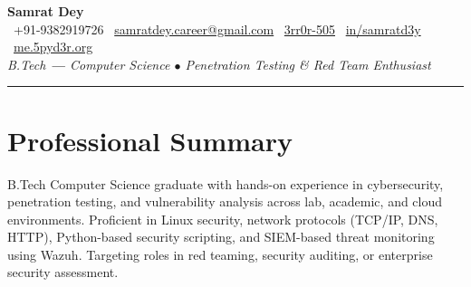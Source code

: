 \documentclass[10pt,a4paper]{article}
\makeatletter
\newcommand{\name}{Samrat Dey}
\newcommand{\phone}{9382919726}
\newcommand{\emaila}{samratdey.career@gmail.com}
\newcommand{\github}{3rr0r-505}
\newcommand{\linkedin}{samratd3y}
\newcommand{\portfolio}{me.5pyd3r.org}
\makeatother
\begin{document}

{
  \centering
  {\LARGE\bfseries \name} \\[5pt]
  \small
  \textcolor{accent}{\faPhone}\ +91-\phone \hspace{4pt}
  \textcolor{accent}{\faEnvelope}\ \href{mailto:\emaila}{\emaila} \hspace{4pt}
  \textcolor{accent}{\faGithub}\ \href{https://github.com/\github}{\github} \hspace{4pt}
  \textcolor{accent}{\faLinkedin}\ \href{https://www.linkedin.com/in/\linkedin/}{in/\linkedin} \hspace{4pt}
  \textcolor{accent}{\faGlobe}\ \href{https://\portfolio}{\portfolio} \\[4pt]
  \textit{\small B.Tech {\large\textbf{---}} Computer Science \hspace{4pt}$\bullet$\hspace{4pt} Penetration Testing \& Red Team Enthusiast} \\[2pt]
  \par
}

\vspace{1mm}
\noindent\textcolor{rulegray}{\rule{\linewidth}{0.4pt}}
\vspace{-2mm}

\section{Professional Summary}
\small
B.Tech Computer Science graduate with hands-on experience in cybersecurity, penetration testing, and vulnerability analysis across lab, academic, and cloud environments. Proficient in Linux security, network protocols (TCP/IP, DNS, HTTP), Python-based security scripting, and SIEM-based threat monitoring using Wazuh. Targeting roles in red teaming, security auditing, or enterprise security assessment.
\end{document}
